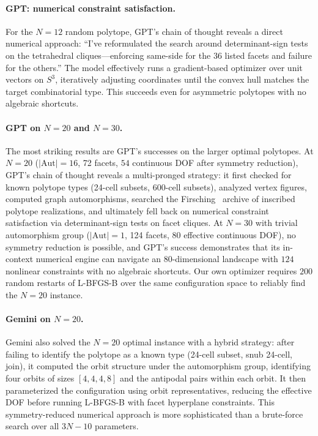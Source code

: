 \documentclass[11pt]{article}
\begin{document}
\paragraph{GPT: numerical constraint satisfaction.}
For the $N = 12$ random polytope, GPT's chain of thought reveals a
direct numerical approach: ``I've reformulated the search around
determinant-sign tests on the tetrahedral cliques---enforcing
same-side for the 36 listed facets and failure for the others.''
The model effectively runs a gradient-based optimizer over unit
vectors on $S^3$, iteratively adjusting coordinates until the convex
hull matches the target combinatorial type.  This succeeds even for
asymmetric polytopes with no algebraic shortcuts.

\paragraph{GPT on $N = 20$ and $N = 30$.}
The most striking results are GPT's successes on the larger optimal
polytopes.  At $N = 20$ ($|\mathrm{Aut}| = 16$, 72 facets, $54$
continuous DOF after symmetry reduction), GPT's chain of thought
reveals a multi-pronged strategy: it first checked for known polytope
types (24-cell subsets, 600-cell subsets), analyzed vertex figures,
computed graph automorphisms, searched the
Firsching~\cite{Firsching} archive of inscribed polytope realizations,
and ultimately fell back on numerical constraint satisfaction via
determinant-sign tests on facet cliques.  At $N = 30$ with trivial
automorphism group ($|\mathrm{Aut}| = 1$, 124 facets, $80$ effective
continuous DOF), no symmetry reduction is possible, and GPT's success
demonstrates that its in-context numerical engine can navigate an
$80$-dimensional landscape with $124$ nonlinear constraints with no
algebraic shortcuts.  Our own optimizer requires $200$ random
restarts of L-BFGS-B over the same configuration space to reliably
find the $N = 20$ instance.

\paragraph{Gemini on $N = 20$.}
Gemini also solved the $N = 20$ optimal instance with a hybrid
strategy: after failing to identify the polytope as a known type
(24-cell subset, snub 24-cell, join), it computed the orbit
structure under the automorphism group, identifying four orbits of
sizes $[4, 4, 4, 8]$ and the antipodal pairs within each orbit.
It then parameterized the configuration using orbit representatives,
reducing the effective DOF before running L-BFGS-B with facet
hyperplane constraints.  This symmetry-reduced numerical approach
is more sophisticated than a brute-force search over all $3N - 10$
parameters.
\end{document}
